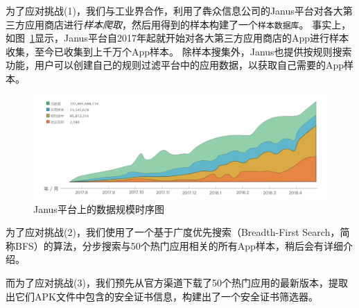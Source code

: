 为了应对挑战(1)，我们与工业界合作，利用了犇众信息公司的Janus平台对各大第三方应用商店进行\emph{样本爬取}，然后用得到的样本构建了一个\texttt{\small 样本数据库}。
事实上，如图~\ref{fig:Janus-data}显示，Janus平台自2017年起就开始对各大第三方应用商店的App进行样本收集，至今已收集到上千万个App样本。
除样本搜集外，Janus也提供按规则搜索功能，用户可以创建自己的规则过滤平台中的应用数据，以获取自己需要的App样本。

\begin{figure}[htbp]
	\centering
	\includegraphics[width=\textwidth]{./Figures/edwin-Janus-data.png}
	\caption{Janus平台上的数据规模时序图}
	\label{fig:Janus-data}
	\vspace{-5mm}
\end{figure}

为了应对挑战(2)，我们使用了一个基于广度优先搜索（Breadth-First Search，简称BFS）的算法，分步搜索与50个热门应用相关的所有App样本，稍后会有详细介绍。

而为了应对挑战(3)，我们预先从官方渠道下载了50个热门应用的最新版本，提取出它们APK文件中包含的安全证书信息，构建出了一个安全证书筛选器。


